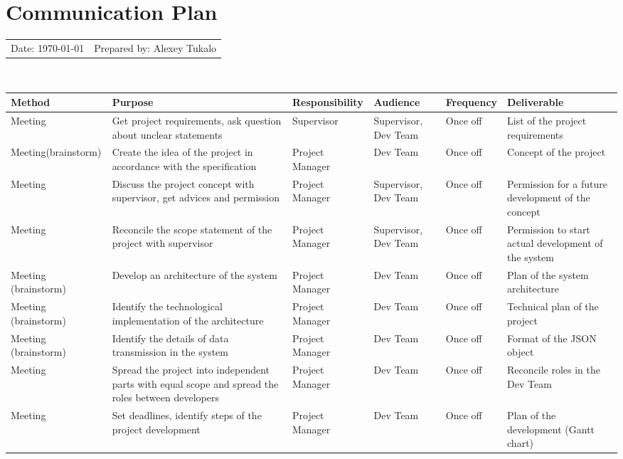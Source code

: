 \documentclass[english]{article}
\begin{document}
\section{Communication Plan }

\begin{tabular}{l l}
Date: \today  & Prepared by: Alexey Tukalo\\
\end{tabular}\\
\begin{tabular}{|p{3cm}|p{5cm}|p{3cm}|p{4cm}|p{1.5cm}|p{5cm}|}
\hline
Method & Purpose & Responsibility & Audience & Frequency & Deliverable\\
\hline
Meeting & 
Get project requirements, ask question about unclear statements &
Supervisor &
Supervisor, Dev Team &
Once off &
List of the project requirements \\
\hline 
Meeting(brainstorm) & 
Create the idea of the project in accordance with the specification &
Project Manager &
Dev Team &
Once off &
Concept of the project \\
\hline 
Meeting & 
Discuss the project concept with supervisor, get advices and permission &
Project Manager &
Supervisor, Dev Team &
Once off &
Permission for a future development of the concept\\
\hline 
Meeting & 
Reconcile the scope statement of the project with supervisor &
Project Manager &
Supervisor, Dev Team &
Once off &
Permission to start actual development of the system\\
\hline 
Meeting (brainstorm) & 
Develop an architecture of the system &
Project Manager &
Dev Team &
Once off &
Plan of the system architecture\\
\hline 
Meeting (brainstorm) & 
Identify the technological implementation of the architecture &
Project Manager &
Dev Team &
Once off &
Technical plan of the project\\
\hline 
Meeting (brainstorm) & 
Identify the details of data transmission in the system &
Project Manager &
Dev Team &
Once off &
Format of the JSON object\\
\hline 
Meeting & 
Spread the project into independent parts with equal scope and spread the roles between developers &
Project Manager &
Dev Team &
Once off &
Reconcile roles in the Dev Team\\
\hline 
Meeting & 
Set deadlines, identify steps of the project development &
Project Manager &
Dev Team &
Once off &
Plan of the development (Gantt chart)\\

\end{tabular}
\end{document}
